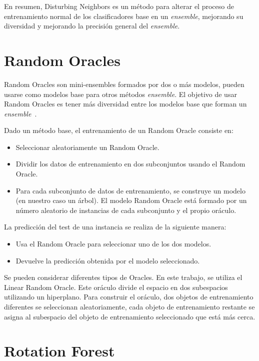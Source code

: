 En resumen, Disturbing Neighbors es un método para alterar el proceso de entrenamiento normal de los clasificadores base en un \textit{ensemble}, mejorando su diversidad y mejorando la precisión general del \textit{ensemble}.

\section{Random Oracles}

Random Oracles son mini-ensembles formados por dos o más modelos, pueden usarse como modelos base para otros métodos \textit{ensemble}. El objetivo de usar Random Oracles es tener más diversidad entre los modelos base que forman un \textit{ensemble}~\cite{randomoracles}.

Dado un método base, el entrenamiento de un Random Oracle consiste en:
\begin{itemize}

	\item Seleccionar aleatoriamente un Random Oracle.
	\item Dividir los datos de entrenamiento en dos subconjuntos usando el Random Oracle.
	\item Para cada subconjunto de datos de entrenamiento, se construye un modelo (en nuestro caso un árbol). El modelo Random Oracle está formado por un número aleatorio de instancias de cada subconjunto y el propio oráculo.
\end{itemize}
La predicción del test de una instancia se realiza de la siguiente manera: 
\begin{itemize}
	\item Usa el Random Oracle para seleccionar uno de los dos modelos.
	\item Devuelve la predicción obtenida por el modelo seleccionado.
\end{itemize}

Se pueden considerar diferentes tipos de Oracles. En este trabajo, se utiliza el Linear Random Oracle. Este oráculo divide el espacio en dos subespacios utilizando un hiperplano. Para construir el oráculo, dos objetos de entrenamiento diferentes se seleccionan aleatoriamente, cada objeto de entrenamiento restante se asigna al subespacio del objeto de entrenamiento seleccionado que está más cerca.

\section{Rotation Forest}

